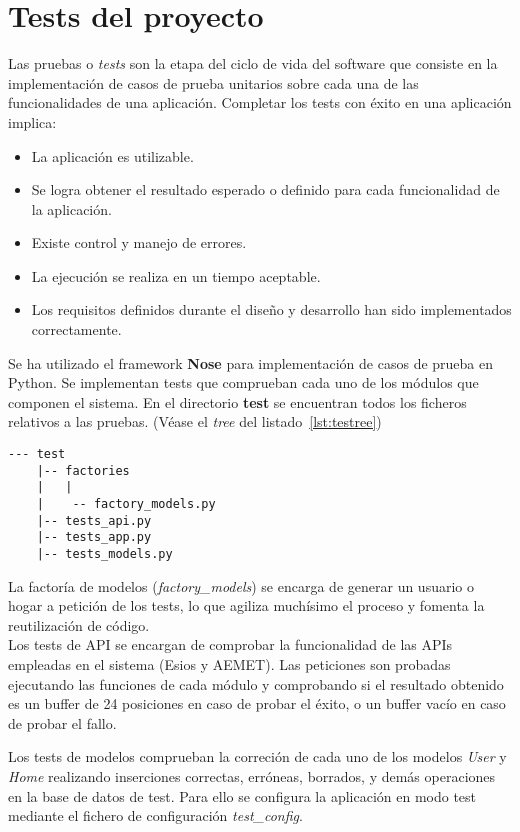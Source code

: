 \chapter{Tests del proyecto}
\label{cap:AnexoB}
Las pruebas o \textit{tests} son la etapa del ciclo de vida del software que consiste en la implementación de casos de prueba unitarios sobre cada una de las funcionalidades de una aplicación. Completar los tests con éxito en una aplicación implica:
\begin{itemize}
\item La aplicación es utilizable.
\item Se logra obtener el resultado esperado o definido para cada funcionalidad de la aplicación.
\item Existe control y manejo de errores.
\item La ejecución se realiza en un tiempo aceptable.
\item Los requisitos definidos durante el diseño y desarrollo han sido implementados correctamente.
\end{itemize}

Se ha utilizado el framework \textbf{Nose} para implementación de casos de prueba en Python. Se implementan tests que comprueban cada uno de los módulos que componen el sistema. En el directorio \textbf{test} se encuentran todos los ficheros relativos a las pruebas. (Véase el \textit{tree} del listado~\ref{lst:testree})
\begin{lstlisting}[numbers=none,caption={Estructura del directorio \textit{test}},label={lst:testree}]
 --- test
    |-- factories
    |   |
    |    -- factory_models.py
    |-- tests_api.py
    |-- tests_app.py
    |-- tests_models.py
\end{lstlisting}

La factoría de modelos (\textit{factory\_models}) se encarga de generar un usuario o hogar a petición de los tests, lo que agiliza muchísimo el proceso y fomenta la reutilización de código.\\

Los tests de API se encargan de comprobar la funcionalidad de las APIs empleadas en el sistema (Esios y AEMET). Las peticiones son probadas ejecutando las funciones de cada módulo y comprobando si el resultado obtenido es un buffer de 24 posiciones en caso de probar el éxito, o un buffer vacío en caso de probar el fallo.

Los tests de modelos comprueban la correción de cada uno de los modelos \textit{User} y \textit{Home} realizando inserciones correctas, erróneas, borrados, y demás operaciones en la base de datos de test. Para ello se configura la aplicación en modo test mediante el fichero de configuración \textit{test\_config}.

